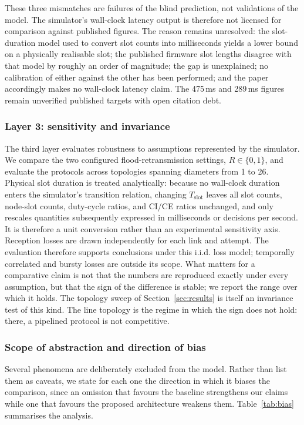 \documentclass[journal]{IEEEtran}
\newcommand{\Nretx}{R}                    %
\newcommand{\Tslot}{T_{\mathrm{slot}}}    %
\begin{document}
These three mismatches are failures of the blind prediction, not
validations of the model. The simulator's wall-clock latency output is
therefore not licensed for comparison against published figures. The
reason remains unresolved: the slot-duration model used to convert slot
counts into milliseconds yields a lower bound on a physically realisable
slot; the published firmware slot lengths disagree with that model by
roughly an order of magnitude; the gap is unexplained; no calibration of
either against the other has been performed; and the paper accordingly
makes no wall-clock latency claim. The 475\,ms and 289\,ms figures remain
unverified published targets with open citation debt.

\subsubsection{Layer 3: sensitivity and invariance}
The third layer evaluates robustness to assumptions represented by the
simulator. We compare the two configured flood-retransmission settings,
$\Nretx \in \{0,1\}$, and evaluate the protocols across topologies spanning
diameters from 1 to 26. Physical slot duration is treated analytically:
because no wall-clock duration enters the simulator's transition relation,
changing $\Tslot$ leaves all slot counts, node-slot counts, duty-cycle
ratios, and CI/CE ratios unchanged, and only rescales quantities subsequently
expressed in milliseconds or decisions per second. It is therefore a unit
conversion rather than an experimental sensitivity axis. Reception losses
are drawn independently for each link and attempt. The evaluation therefore
supports conclusions under this i.i.d. loss model; temporally correlated and
bursty losses are outside its scope. What matters for a comparative claim is
not that the numbers are reproduced exactly under every assumption, but that
the sign of the difference is stable; we report the range over which it
holds. The topology sweep of Section~\ref{sec:results} is itself an
invariance test of this kind. The line topology is the regime in which the
sign does not hold: there, a pipelined protocol is not competitive.

\subsubsection{Scope of abstraction and direction of bias}
Several phenomena are deliberately excluded from the model. Rather than
list them as caveats, we state for each one the direction in which it
biases the comparison, since an omission that favours the baseline
strengthens our claims while one that favours the proposed architecture
weakens them. Table~\ref{tab:bias} summarises the analysis.
\end{document}
